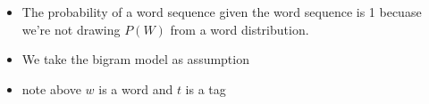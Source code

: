 \documentclass[11pt]{article}
\begin{document}
\begin{minipage}[l]{.5\linewidth}
    \begin{figure}[H]
        \centering
    \end{figure}    
\end{minipage}\hfill
\begin{minipage}[r]{.48\linewidth}
    \begin{itemize}
        \item The probability of a word sequence given the word sequence is 1 becuase we're not drawing $P(W)$ from a word distribution. 
        \item We take the bigram model as assumption
        \item note above $w$ is a word and $t$ is a tag
    \end{itemize}
\end{minipage}
\end{document}
